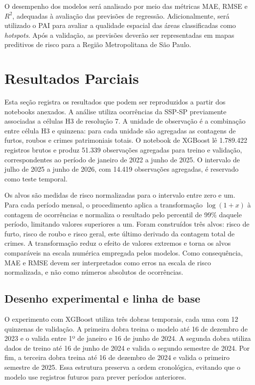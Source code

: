 \documentclass[12pt]{article}
\begin{document}
O desempenho dos modelos será analisado por meio das métricas MAE, RMSE e $R^2$, adequadas à avaliação das previsões de regressão. Adicionalmente, será utilizado o PAI para avaliar a qualidade espacial das áreas classificadas como \textit{hotspots}. Após a validação, as previsões deverão ser representadas em mapas preditivos de risco para a Região Metropolitana de São Paulo.

\vspace{1.2cm}

\section{Resultados Parciais}

Esta seção registra os resultados que podem ser reproduzidos a partir dos notebooks anexados. A análise utiliza ocorrências da SSP-SP previamente associadas a células H3 de resolução 7. A unidade de observação é a combinação entre célula H3 e quinzena: para cada unidade são agregadas as contagens de furtos, roubos e crimes patrimoniais totais. O notebook de XGBoost lê 1.789.422 registros brutos e produz 51.339 observações agregadas para treino e validação, correspondentes ao período de janeiro de 2022 a junho de 2025. O intervalo de julho de 2025 a junho de 2026, com 14.419 observações agregadas, é reservado como teste temporal.

Os alvos são medidas de risco normalizadas para o intervalo entre zero e um. Para cada período mensal, o procedimento aplica a transformação $\log(1+x)$ à contagem de ocorrências e normaliza o resultado pelo percentil de 99\% daquele período, limitando valores superiores a um. Foram construídos três alvos: risco de furto, risco de roubo e risco geral, este último derivado da contagem total de crimes. A transformação reduz o efeito de valores extremos e torna os alvos comparáveis na escala numérica empregada pelos modelos. Como consequência, MAE e RMSE devem ser interpretados como erros na escala de risco normalizada, e não como números absolutos de ocorrências.

\subsection{Desenho experimental e linha de base}

O experimento com XGBoost utiliza três dobras temporais, cada uma com 12 quinzenas de validação. A primeira dobra treina o modelo até 16 de dezembro de 2023 e o valida entre 1º de janeiro e 16 de junho de 2024. A segunda dobra utiliza dados de treino até 16 de junho de 2024 e valida o segundo semestre de 2024. Por fim, a terceira dobra treina até 16 de dezembro de 2024 e valida o primeiro semestre de 2025. Essa estrutura preserva a ordem cronológica, evitando que o modelo use registros futuros para prever períodos anteriores.
\end{document}
